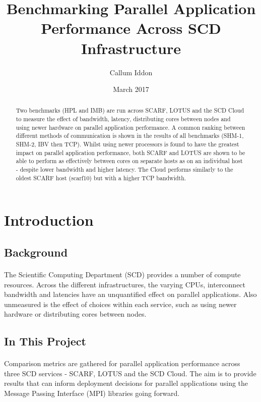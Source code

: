 \documentclass{article}
\title{Benchmarking Parallel Application Performance Across SCD Infrastructure}
\author{Callum Iddon }
\date{March 2017}
\begin{document}

\maketitle

\begin{abstract}
Two benchmarks (HPL and IMB) are run across SCARF, LOTUS and the SCD Cloud to measure the effect of bandwidth, latency, distributing cores between nodes and using newer hardware on parallel application performance. A common ranking between different methods of communication is shown in the results of all benchmarks (SHM-1, SHM-2, IBV then TCP). Whilst using newer processors is found to have the greatest impact on parallel application performance, both SCARF and LOTUS are shown to be able to perform as effectively between cores on separate hosts as on an individual host - despite lower bandwidth and higher latency. The Cloud performs similarly to the oldest SCARF host (scarf10) but with a higher TCP bandwidth.
\end{abstract}


\tableofcontents

\section{Introduction}

    \subsection{Background}
        \paragraph{}
        The Scientific Computing Department (SCD) provides a number of compute resources. Across the different infrastructures, the varying CPUs, interconnect bandwidth and latencies have an unquantified effect on parallel applications. Also unmeasured is the effect of choices within each service, such as using newer hardware or distributing cores between nodes.

    \subsection{In This Project}
        \paragraph{}
        Comparison metrics are gathered for parallel application performance across three SCD services - SCARF, LOTUS and the SCD Cloud. The aim is to provide results that can inform deployment decisions for parallel applications using the Message Passing Interface (MPI) libraries going forward.
\end{document}
